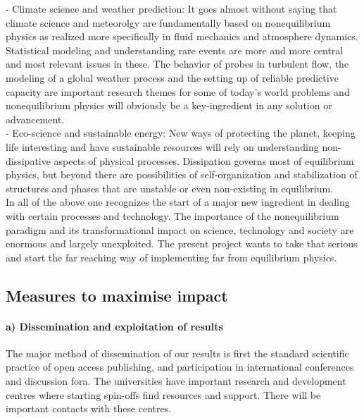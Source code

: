 - Climate science and weather prediction: It goes almost without saying that climate science and meteorolgy are fundamentally based on nonequilibrium physics as realized more specifically in fluid mechanics and atmosphere dynamics. Statistical modeling and understanding rare events are more and more central and most relevant issues in these. The behavior of probes in turbulent flow, the modeling of a global weather process and the setting up of reliable predictive capacity  are important research themes for some of today's world problems and nonequilibrium physics will obviously be a key-ingredient in any solution or advancement.\\ 
- Eco-science and sustainable energy: New ways of protecting the planet, keeping life interesting and have sustainable resources will rely on understanding non-dissipative aspects of physical processes.  Dissipation governs most of equilibrium physics, but beyond there are possibilities of self-organization and stabilization of structures and phases that are unstable or even non-existing in equilibrium. \\ 

In all of the above one recognizes the start of a major new ingredient in dealing with certain processes and technology.  The importance of the nonequilibrium paradigm and its transformational impact on science, technology and society are enormous and largely unexploited.  The present project wants to take that serious and start the far reaching way of implementing far from equilibrium physics. 

\subsection{Measures to maximise impact}

\paragraph{a) Dissemination and exploitation of results}

The major method of dissemination of our results is first the standard scientific practice of open access publishing, and participation in international conferences and discussion fora.  
The universities have important research and development centres where starting spin-offs find resources and support.
There will be important contacts with these centres. \\


